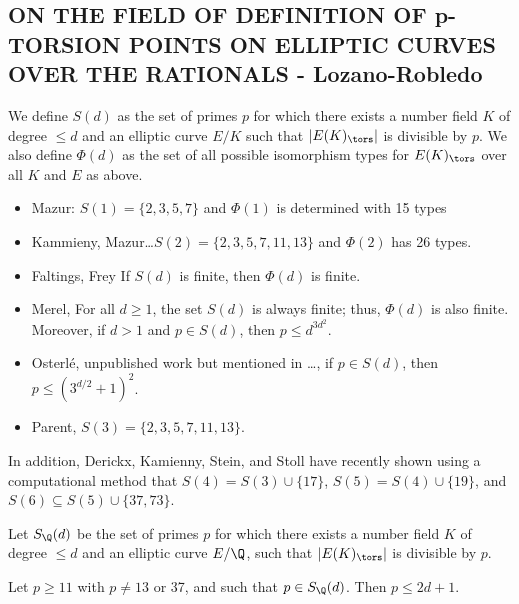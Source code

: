 


\subsection{ON THE FIELD OF DEFINITION OF p-TORSION POINTS ON ELLIPTIC CURVES OVER THE RATIONALS - Lozano-Robledo}

\begin{dfn}
We define $S(d)$ as the set of primes $p$ for which there exists a number field $K$ of degree $\leq d$ and an elliptic curve $E/K$ such that $|E(K)_\tors|$ is divisible by $p$. We also define $\Phi(d)$ as the set of all possible isomorphism types for $E(K)_\tors$ over all $K$ and $E$ as above. 
\end{dfn}


\begin{itemize}
\item Mazur: $S(1)= \{ 2,3,5,7 \}$ and $\Phi(1)$ is determined with 15 types
\item Kammieny, Mazur\dots $S(2)= \{ 2,3,5,7,11,13 \}$ and $\Phi(2)$ has 26 types.
\item Faltings, Frey If $S(d)$ is finite, then $\Phi(d)$ is finite. 
\item Merel, For all $d \geq 1$, the set $S(d)$ is always finite; thus, $\Phi(d)$ is also finite. Moreover, if $d > 1$ and $p \in S(d)$, then $p \leq d^{3d^2}$.
\item Osterl\'e, unpublished work but mentioned in \dots, if $p \in S(d)$, then $p \leq (3^{d/2} + 1)^2$.
\item Parent, $S(3)= \{ 2,3,5,7,11,13 \}$. 
\end{itemize}

In addition, Derickx, Kamienny, Stein, and Stoll have recently shown using a computational method that $S(4)= S(3) \cup \{17\}$, $S(5)= S(4) \cup \{19\}$, and $S(6) \subseteq S(5) \cup \{ 37,73 \}$. 


\begin{dfn} %
Let $S_\Q(d)$ be the set of primes $p$ for which there exists a number field $K$ of degree $\leq d$ and an elliptic curve $E/\Q$, such that $|E(K)_\tors|$ is divisible by $p$. 
\end{dfn}


\begin{thm} %
Let $p \geq 11$ with $p \neq 13$ or 37, and such that $p \in S_\Q(d)$. Then $p \leq 2d + 1$. 
\end{thm}


